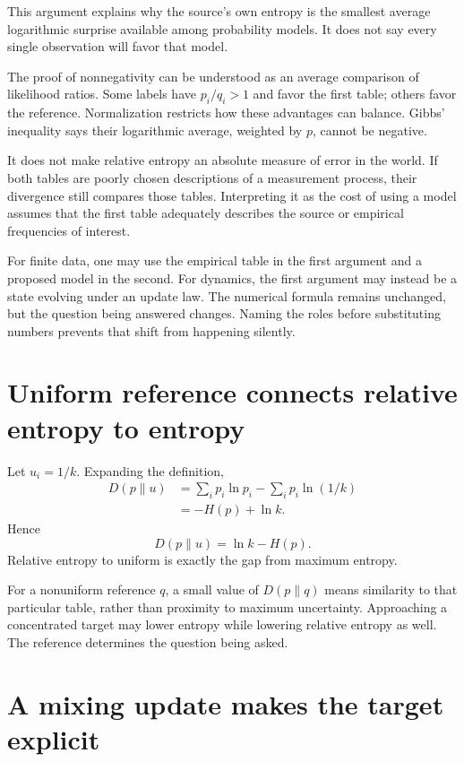 \documentclass[11pt,oneside,openany]{book}
\theoremstyle{definition}
\theoremstyle{remark}
\numberwithin{equation}{chapter}
\begin{document}
This argument explains why the source's own entropy is the smallest average logarithmic surprise available among probability models. It does not say every single observation will favor that model.

The proof of nonnegativity can be understood as an average comparison of likelihood ratios. Some labels have \(p_i/q_i>1\) and favor the first table; others favor the reference. Normalization restricts how these advantages can balance. Gibbs' inequality says their logarithmic average, weighted by \(p\), cannot be negative.

It does not make relative entropy an absolute measure of error in the world. If both tables are poorly chosen descriptions of a measurement process, their divergence still compares those tables. Interpreting it as the cost of using a model assumes that the first table adequately describes the source or empirical frequencies of interest.

For finite data, one may use the empirical table in the first argument and a proposed model in the second. For dynamics, the first argument may instead be a state evolving under an update law. The numerical formula remains unchanged, but the question being answered changes. Naming the roles before substituting numbers prevents that shift from happening silently.

\section{Uniform reference connects relative entropy to entropy}\label{ch06-uniform-reference-connects-relative-entropy-to-entropy}

Let \(u_i=1/k\). Expanding the definition, \[\begin{aligned}
D(p\|u)
&=\sum_i p_i\ln p_i-\sum_i p_i\ln(1/k)\\
&=-H(p)+\ln k.
\end{aligned}\] Hence \[\boxed{D(p\|u)=\ln k-H(p).}\] Relative entropy to uniform is exactly the gap from maximum entropy.

For a nonuniform reference \(q\), a small value of \(D(p\|q)\) means similarity to that particular table, rather than proximity to maximum uncertainty. Approaching a concentrated target may lower entropy while lowering relative entropy as well. The reference determines the question being asked.

\section{A mixing update makes the target explicit}\label{ch06-a-mixing-update-makes-the-target-explicit}
\end{document}
